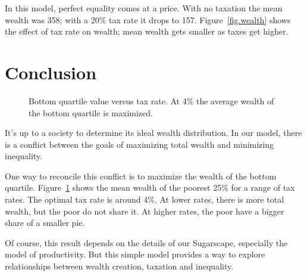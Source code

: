 \documentclass[10pt]{book}
\begin{document}
In this model, perfect equality comes at a price.  With no taxation
the mean wealth was 358; with a 20\% tax rate it drops to 157.
Figure~\ref{fig.wealth} shows the effect of tax rate on wealth;
mean wealth gets smaller as taxes get higher.



\section{Conclusion}

\begin{figure}[ht]
\caption{Bottom quartile value versus tax rate. At 4\% the average wealth of the bottom quartile is maximized.\label{fig.optimal}}
\end{figure}


It's up to a society to determine its ideal wealth distribution. 
In our model, there is a conflict between the goals of maximizing
total wealth and minimizing inequality.

One way to reconcile this conflict is to maximize the wealth of
the bottom quartile.  Figure~\ref{fig.optimal} shows the mean
wealth of the poorest 25\% for a range of tax rates.  The optimal
tax rate is around 4\%.  At lower rates, there is more total
wealth, but the poor do not share it.  At higher rates, the poor
have a bigger share of a smaller pie.

Of course, this result depends on the details of our Sugarscape,
especially the model of productivity.  But this simple model
provides a way to explore relationships between wealth creation,
taxation and inequality.
\end{document}
